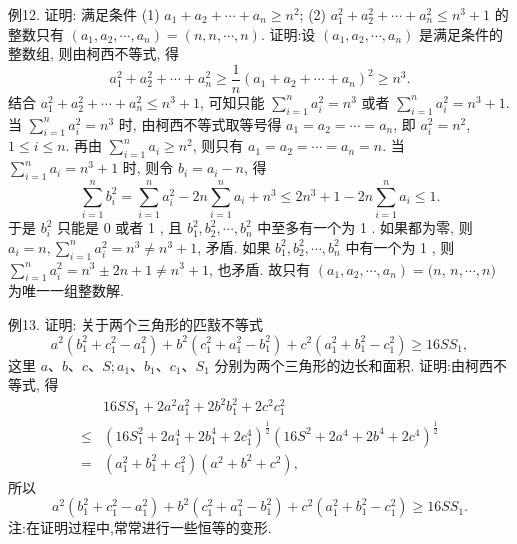 例12. 证明: 满足条件
(1) $a_1+a_2+\cdots+a_n \geqslant n^2$;
(2) $a_1^2+a_2^2+\cdots+a_n^2 \leqslant n^3+1$
的整数只有 $\left(a_1, a_2, \cdots, a_n\right)=(n, n, \cdots, n)$.
证明:设 $\left(a_1, a_2, \cdots, a_n\right)$ 是满足条件的整数组, 则由柯西不等式, 得
$$
a_1^2+a_2^2+\cdots+a_n^2 \geqslant \frac{1}{n}\left(a_1+a_2+\cdots+a_n\right)^2 \geqslant n^3 .
$$
结合 $a_1^2+a_2^2+\cdots+a_n^2 \leqslant n^3+1$, 可知只能 $\sum_{i=1}^n a_i^2=n^3$ 或者 $\sum_{i=1}^n a_i^2= n^3+1$.
当 $\sum_{i=1}^n a_i^2=n^3$ 时, 由柯西不等式取等号得 $a_1=a_2=\cdots=a_n$, 即 $a_i^2=n^2$, $1 \leqslant i \leqslant n$. 再由 $\sum_{i=1}^n a_i \geqslant n^2$, 则只有 $a_1=a_2=\cdots=a_n=n$.
当 $\sum_{i=1}^n a_i=n^3+1$ 时, 则令 $b_i=a_i-n$, 得
$$
\sum_{i=1}^n b_i^2=\sum_{i=1}^n a_i^2-2 n \sum_{i=1}^n a_i+n^3 \leqslant 2 n^3+1-2 n \sum_{i=1}^n a_i \leqslant 1 .
$$
于是 $b_i^2$ 只能是 0 或者 1 , 且 $b_1^2, b_2^2, \cdots, b_n^2$ 中至多有一个为 1 . 如果都为零, 则 $a_i=n, \sum_{i=1}^n a_i^2=n^3 \neq n^3+1$, 矛盾.
如果 $b_1^2, b_2^2, \cdots, b_n^2$ 中有一个为 1 , 则 $\sum_{i=1}^n a_i^2=n^3 \pm 2 n+1 \neq n^3+1$, 也矛盾.
故只有 $\left(a_1, a_2, \cdots, a_n\right)=(n$, $n, \cdots, n)$ 为唯一一组整数解.



例13. 证明: 关于两个三角形的匹㪡不等式
$$
a^2\left(b_1^2+c_1^2-a_1^2\right)+b^2\left(c_1^2+a_1^2-b_1^2\right)+c^2\left(a_1^2+b_1^2-c_1^2\right) \geqslant 16 S S_1,
$$
这里 $a 、 b 、 c 、 S ; a_1 、 b_1 、 c_1 、 S_1$ 分别为两个三角形的边长和面积.
证明:由柯西不等式, 得
$$
\begin{aligned}
& 16 S S_1+2 a^2 a_1^2+2 b^2 b_1^2+2 c^2 c_1^2 \\
\leqslant & \left(16 S_1^2+2 a_1^4+2 b_1^4+2 c_1^4\right)^{\frac{1}{2}}\left(16 S^2+2 a^4+2 b^4+2 c^4\right)^{\frac{1}{2}} \\
= & \left(a_1^2+b_1^2+c_1^2\right)\left(a^2+b^2+c^2\right),
\end{aligned}
$$
所以
$$
a^2\left(b_1^2+c_1^2-a_1^2\right)+b^2\left(c_1^2+a_1^2-b_1^2\right)+c^2\left(a_1^2+b_1^2-c_1^2\right) \geqslant 16 S S_1 .
$$
注:在证明过程中,常常进行一些恒等的变形.



